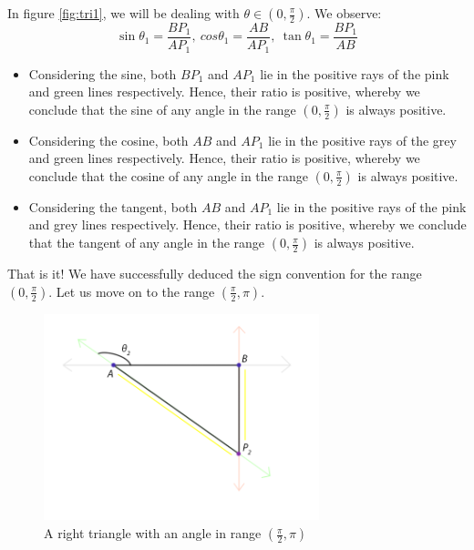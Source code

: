 \documentclass{article}
\begin{document}
In figure \ref{fig:tri1}, we will be dealing with $\theta\in(0,\frac{\pi}{2})$. We observe:
$$\sin\theta_1=\frac{BP_1}{AP_1},\ cos\theta_1=\frac{AB}{AP_1},\ \tan\theta_1=\frac{BP_1}{AB}$$
\begin{itemize}
    \item Considering the sine, both $BP_1$ and $AP_1$ lie in the positive rays of the pink and green lines respectively. Hence, their ratio is positive, whereby we conclude that the sine of any angle in the range $(0,\frac{\pi}{2})$ is always positive.
    \item Considering the cosine, both $AB$ and $AP_1$ lie in the positive rays of the grey and green lines respectively. Hence, their ratio is positive, whereby we conclude that the cosine of any angle in the range $(0,\frac{\pi}{2})$ is always positive.
    \item Considering the tangent, both $AB$ and $AP_1$ lie in the positive rays of the pink and grey lines respectively. Hence, their ratio is positive, whereby we conclude that the tangent of any angle in the range $(0,\frac{\pi}{2})$ is always positive.
\end{itemize}

That is it! We have successfully deduced the sign convention for the range $(0,\frac{\pi}{2})$. Let us move on to the range $(\frac{\pi}{2},\pi)$.

\begin{figure}[!h]
    \centering
    \includegraphics[width=8cm]{triangle2}
    \caption{A right triangle with an angle in range $(\frac{\pi}{2},\pi)$}
    \label{fig:tri2}
\end{figure}
\end{document}
